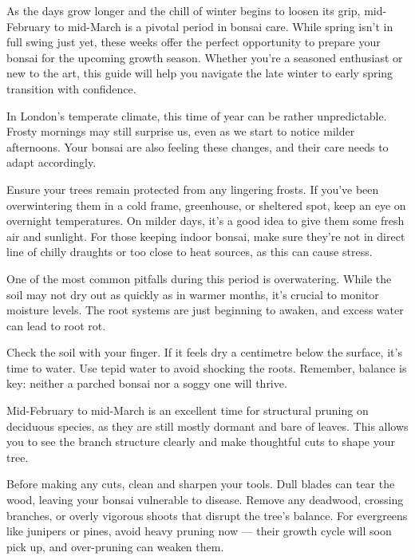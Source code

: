 \label{2025-02-care}

As the days grow longer and the chill of winter begins to loosen its grip, mid\--February to mid\--March is a pivotal period in bonsai care.
While spring isn't in full swing just yet, these weeks offer the perfect opportunity to prepare your bonsai for the upcoming growth season.
Whether you're a seasoned enthusiast or new to the art, this guide will help you navigate the late winter to early spring transition with confidence.

\medskip
{}
\noindent
In London's temperate climate, this time of year can be rather unpredictable.
Frosty mornings may still surprise us, even as we start to notice milder afternoons.
Your bonsai are also feeling these changes, and their care needs to adapt accordingly.

Ensure your trees remain protected from any lingering frosts.
If you've been overwintering them in a cold frame, greenhouse, or sheltered spot, keep an eye on overnight temperatures.
On milder days, it's a good idea to give them some fresh air and sunlight.
For those keeping indoor bonsai, make sure they're not in direct line of chilly draughts or too close to heat sources, as this can cause stress.

\medskip
{}
\noindent
One of the most common pitfalls during this period is overwatering.
While the soil may not dry out as quickly as in warmer months, it's crucial to monitor moisture levels.
The root systems are just beginning to awaken, and excess water can lead to root rot.

Check the soil with your finger.
If it feels dry a centimetre below the surface, it's time to water.
Use tepid water to avoid shocking the roots.
Remember, balance is key: neither a parched bonsai nor a soggy one will thrive.

\medskip
{}
\noindent
Mid\--February to mid\--March is an excellent time for structural pruning on deciduous species, as they are still mostly dormant and bare of leaves.
This allows you to see the branch structure clearly and make thoughtful cuts to shape your tree.

Before making any cuts, clean and sharpen your tools.
Dull blades can tear the wood, leaving your bonsai vulnerable to disease.
Remove any deadwood, crossing branches, or overly vigorous shoots that disrupt the tree's balance.
For evergreens like junipers or pines, avoid heavy pruning now --- their growth cycle will soon pick up, and over\--pruning can weaken them.

